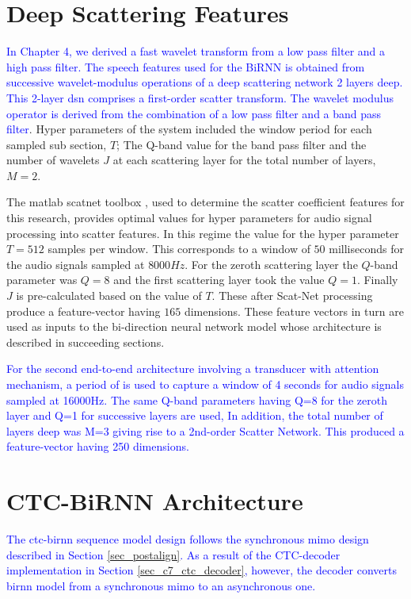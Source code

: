 \section{Deep Scattering Features}\label{sec_c7_wparams}
\textcolor{blue}{In Chapter 4, we derived a fast wavelet transform from a low pass filter and a high pass filter.  The speech features used for the BiRNN is obtained from successive wavelet-modulus operations of a deep scattering network 2 layers deep.  This 2-layer \acrshort{dsn} comprises a first-order scatter transform. The wavelet modulus operator is derived from the combination of a low pass filter and a band pass filter}.  Hyper parameters of the system included the window period for each sampled sub section, $T$;  The Q-band value for the band pass filter and the number of wavelets $J$ at each scattering layer for the total number of layers, $M=2$.

The matlab scatnet toolbox \citep{anden2014scatnet}, used to determine the scatter coefficient features for this research, provides optimal values for hyper parameters for audio signal processing into scatter features.  In this regime the value for the hyper parameter $T=512$ samples per window. This corresponds to a window of $50$ milliseconds for the audio signals sampled at $8000 Hz$.  For the zeroth scattering layer the $Q$-band parameter was $Q=8$ and the first scattering layer took the value  $Q=1$.  Finally $J$ is pre-calculated based on the value of $T$.  These after Scat-Net processing produce a feature-vector having $165$ dimensions.  These feature vectors in turn are used as inputs to the bi-direction neural network model whose architecture is described in succeeding sections.

\textcolor{blue}{For the second end-to-end architecture involving a transducer with attention mechanism, a period of  is used to capture a window of 4 seconds for audio signals sampled at 16000Hz. The same Q-band parameters having Q=8 for the zeroth layer and Q=1 for successive layers are used, In addition, the total number of layers deep was M=3 giving rise to a 2nd-order Scatter Network. This produced a feature-vector having 250 dimensions.}

\section{CTC-BiRNN Architecture}\label{sec_c7_birnn}

\textcolor{blue}{The \acrshort{ctc}-\acrshort{birnn} sequence model design follows the synchronous \acrshort{mimo} design described in Section \ref{sec_postalign}. As a result of the CTC-decoder implementation in Section \ref{sec_c7_ctc_decoder}, however, the decoder converts \acrshort{birnn} model from a synchronous \acrshort{mimo} to an asynchronous one.}

